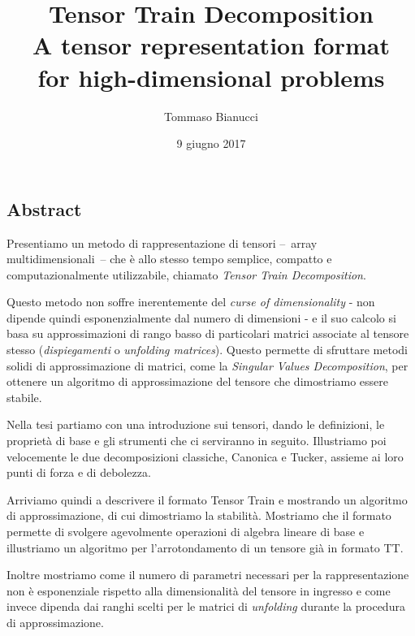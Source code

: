 \documentclass[11pt,a4paper]{article}
\title{Tensor Train Decomposition\\A tensor representation format\\for high-dimensional problems}
\author{Tommaso Bianucci}
\date{9 giugno 2017}
\begin{document}
\maketitle
\begin{center}
\subsection*{Abstract}
\end{center}

Presentiamo un metodo di rappresentazione di tensori --~array multidimensionali~-- che è allo stesso tempo semplice, compatto e computazionalmente utilizzabile, chiamato \emph{Tensor Train Decomposition}.

Questo metodo non soffre inerentemente del \emph{curse of dimensionality} - non dipende quindi esponenzialmente dal numero di dimensioni - e il suo calcolo si basa su approssimazioni di rango basso di particolari matrici associate al tensore stesso (\emph{dispiegamenti} o \emph{unfolding matrices}).
Questo permette di sfruttare metodi solidi di approssimazione di matrici, come la \emph{Singular Values Decomposition}, per ottenere un algoritmo di approssimazione del tensore che dimostriamo essere stabile.

Nella tesi partiamo con una introduzione sui tensori, dando le definizioni, le proprietà di base e gli strumenti che ci serviranno in seguito.
Illustriamo poi velocemente le due decomposizioni classiche, Canonica e Tucker, assieme ai loro punti di forza e di debolezza.

Arriviamo quindi a descrivere il formato Tensor Train e mostrando un algoritmo di approssimazione, di cui dimostriamo la stabilità. Mostriamo che il formato permette di svolgere agevolmente operazioni di algebra lineare di base e illustriamo un algoritmo per l'arrotondamento di un tensore già in formato TT.

Inoltre mostriamo come il numero di parametri necessari per la rappresentazione non è esponenziale rispetto alla dimensionalità del tensore in ingresso e come invece dipenda dai ranghi scelti per le matrici di \emph{unfolding} durante la procedura di approssimazione.
\end{document}
